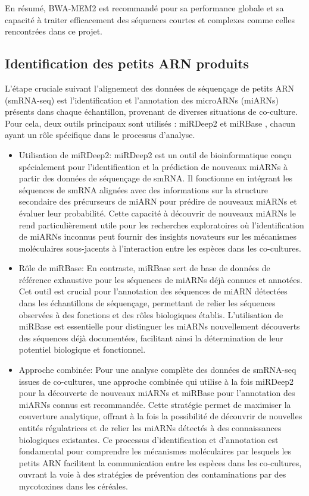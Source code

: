 \documentclass{report}
\begin{document}
En résumé, BWA-MEM2 est recommandé pour sa performance globale et sa capacité à traiter efficacement des séquences courtes et complexes comme celles rencontrées dans ce projet. 

\subsection{Identification des petits ARN produits}
L'étape cruciale suivant l'alignement des données de séquençage de petits ARN (smRNA-seq) est l'identification et l'annotation des microARNs (miARNs) présents dans chaque échantillon, provenant de diverses situations de co-culture. Pour cela, deux outils principaux sont utilisés : miRDeep2\cite{friedlander2012discover} et miRBase \cite{kozomara2019mirbase}, chacun ayant un rôle spécifique dans le processus d'analyse.\\ 

\begin{itemize}
    \item Utilisation de miRDeep2:
    miRDeep2 est un outil de bioinformatique conçu spécialement pour l'identification et la prédiction de nouveaux miARNs à partir des données de séquençage de smRNA. Il fonctionne en intégrant les séquences de smRNA alignées avec des informations sur la structure secondaire des précurseurs de miARN pour prédire de nouveaux miARNs et évaluer leur probabilité. Cette capacité à découvrir de nouveaux miARNs le rend particulièrement utile pour les recherches exploratoires où l'identification de miARNs inconnus peut fournir des insights novateurs sur les mécanismes moléculaires sous-jacents à l'interaction entre les espèces dans les co-cultures.
    \item Rôle de miRBase:
    En contraste, miRBase sert de base de données de référence exhaustive pour les séquences de miARNs déjà connues et annotées. Cet outil est crucial pour l'annotation des séquences de miARN détectées dans les échantillons de séquençage, permettant de relier les séquences observées à des fonctions et des rôles biologiques établis. L'utilisation de miRBase est essentielle pour distinguer les miARNs nouvellement découverts des séquences déjà documentées, facilitant ainsi la détermination de leur potentiel biologique et fonctionnel.
    \item Approche combinée:
    Pour une analyse complète des données de smRNA-seq issues de co-cultures, une approche combinée qui utilise à la fois miRDeep2 pour la découverte de nouveaux miARNs et miRBase pour l'annotation des miARNs connus est recommandée. Cette stratégie permet de maximiser la couverture analytique, offrant à la fois la possibilité de découvrir de nouvelles entités régulatrices et de relier les miARNs détectés à des connaissances biologiques existantes. Ce processus d'identification et d'annotation est fondamental pour comprendre les mécanismes moléculaires par lesquels les petits ARN facilitent la communication entre les espèces dans les co-cultures, ouvrant la voie à des stratégies de prévention des contaminations par des mycotoxines dans les céréales.
\end{itemize} \vspace{.5cm}
\end{document}

